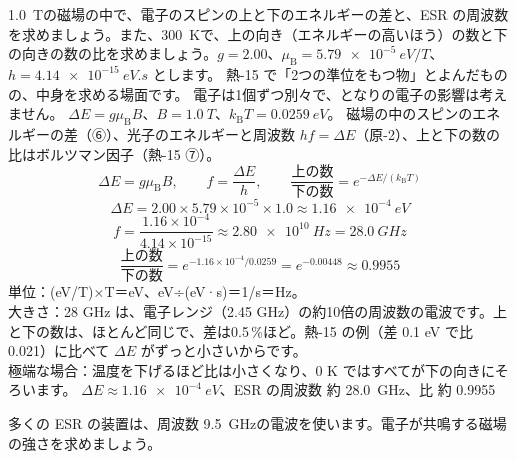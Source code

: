 \label{ph:原-7:ex6}
\begin{phreidai}
\qty{1.0}{T}の磁場の中で、電子のスピンの上と下のエネルギーの差と、ESR の周波数を求めましょう。また、\qty{300}{K}で、上の向き（エネルギーの高いほう）の数と下の向きの数の比を求めましょう。$g=2.00$、$\mu_{\mathrm B}=\qty{5.79e-5}{eV/T}$、$h=\qty{4.14e-15}{eV.s}$ とします。
\phbamen
熱-15 で「2つの準位をもつ物」とよんだものの、中身を求める場面です。
\phmushi
電子は1個ずつ別々で、となりの電子の影響は考えません。
\phzu
$\Delta E=g\mu_{\mathrm B}B$、$B=\qty{1.0}{T}$、$k_{\mathrm B}T=\qty{0.0259}{eV}$。
\phriyu
磁場の中のスピンのエネルギーの差（⑥）、光子のエネルギーと周波数 $hf=\Delta E$（原-2）、上と下の数の比はボルツマン因子（熱-15 ⑦）。
\phtateru
\[ \Delta E=g\mu_{\mathrm B}B,\qquad f=\frac{\Delta E}{h},\qquad \frac{\text{上の数}}{\text{下の数}}=e^{-\Delta E/(k_{\mathrm B}T)} \]
\phtoku
\[ \Delta E=2.00\times5.79\times10^{-5}\times1.0\approx\qty{1.16e-4}{eV} \]
\[ f=\frac{1.16\times10^{-4}}{4.14\times10^{-15}}\approx\qty{2.80e10}{Hz}=\qty{28.0}{GHz} \]
\[ \frac{\text{上の数}}{\text{下の数}}=e^{-1.16\times10^{-4}/0.0259}=e^{-0.00448}\approx0.9955 \]
\phtashikame
単位：(eV/T)×T＝eV、eV÷(eV·s)＝1/s＝Hz。\\
大きさ：28 GHz は、電子レンジ（2.45 GHz）の約10倍の周波数の電波です。上と下の数は、ほとんど同じで、差は0.5\,\%ほど。熱-15 の例（差 0.1 eV で比 0.021）に比べて $\Delta E$ がずっと小さいからです。\\
極端な場合：温度を下げるほど比は小さくなり、0 K ではすべてが下の向きにそろいます。
\kotae $\Delta E\approx\qty{1.16e-4}{eV}$、ESR の周波数 約 \qty{28.0}{GHz}、比 約 0.9955
\end{phreidai}
\begin{jibun}
多くの ESR の装置は、周波数 \qty{9.5}{GHz}の電波を使います。電子が共鳴する磁場の強さを求めましょう。
\end{jibun}

